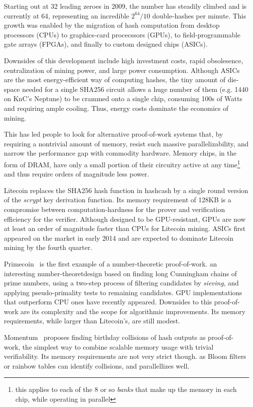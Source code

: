 \documentclass[11pt, oneside]{article}
\begin{document}
Starting out at
32 leading zeroes in 2009, the number has steadily climbed and is currently
at 64, representing an incredible $2^{64}/10$ double-hashes per minute.
This growth was enabled by the migration of hash computation from 
desktop processors (CPUs) to graphics-card procecssors (GPUs),
to field-programmable gate arrays (FPGAs), and finally to custom designed
chips (ASICs).

Downsides of this development include high investment costs, rapid
obsolesence, centralization of mining power, and large power consumption.
Although ASICs are the most energy-efficient way of computing hashes,
the tiny amount of die-space needed for a single SHA256 circuit allows
a huge number of them (e.g. 1440 on KnC's Neptune) to be crammed onto a
single chip, consuming 100s of Watts and requiring ample cooling.
Thus, energy costs dominate the economics of mining.

This has led people to look for alternative proof-of-work systems
that, by requiring a nontrivial amount of memory, resist such
massive parallelizability, and narrow the performance gap
with commodity hardware. Memory chips, in the form of DRAM,
have only a small portion of their circuitry active at any
time\footnote{this applies to each of the 8 or so {\em banks} that make up the memory in each chip,
while operating in parallel} and thus require orders of magnitude less power.

Litecoin replaces the SHA256 hash function in hashcash by a single round
version of the {\em scrypt} key derivation function. Its memory requirement
of 128KB is a compromise between computation-hardness for the prover and
verification efficiency for the verifier. Although designed to be
GPU-resistant, GPUs are now at least an order of magnitude faster
than CPUs for Litecoin mining. ASICs first appeared on the market in early 2014
and are expected to dominate Litecoin mining by the fourth quarter.

Primecoin~\cite{king2013} is the first example of a number-theoretic proof-of-work.
an interesting number-theoretdesign based on finding long
Cunningham chains of prime numbers, using a two-step process of filtering
candidates by {\em sieving}, and applying pseudo-primality tests to remaining
candidates. GPU implementations that outperform CPU ones have recently appeared.
Downsides to this proof-of-work are its complexity and the scope for
algorithmic improvements. Its memory requirements, while larger than Litecoin's,
are still modest.

Momentum~\cite{larimer2013} proposes finding birthday collisions of hash
outputs as proof-of-work, the simplest way to combine scalable memory usage
with trivial verifiability. Its memory requirements are not very strict
though. as Bloom filters or rainbow tables can identify collisions, and
parallellizes well.
\end{document}
